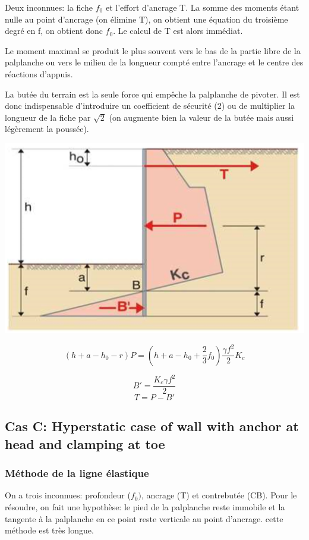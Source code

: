 Deux inconnues: la fiche $f_0$ et l'effort d'ancrage T. La somme des moments étant nulle au point d'ancrage (on élimine T), on obtient une équation du troisième degré en f, on obtient donc $f_0$. Le calcul de T est alors immédiat.

Le moment maximal se produit le plus souvent vers le bas de la partie libre de la palplanche ou vers le milieu de la longueur compté entre l'ancrage et le centre des réactions d'appuis.

La butée du terrain est la seule force qui empêche la palplanche de pivoter. Il est donc indispensable d'introduire un coefficient de sécurité (2) ou de multiplier la longueur de la fiche par $\sqrt{2}$ (on augmente bien la valeur de la butée mais aussi légèrement la poussée).

\begin{center}
\includegraphics [scale=0.8]{pictures/38.PNG}
\end{center}

$$(h+a-h_0-r)P =(h+a-h_0+\frac{2}{3}f_0)\frac{\gamma f^2}{2}K_c$$ 

$$ B'=\frac{K_c \gamma f^2}{2} $$
$$ T = P - B'$$

\subsection{Cas C: Hyperstatic case of wall with anchor at head and clamping at toe}

\subsubsection{Méthode de la ligne élastique}

On a trois inconnues: profondeur ($f_0)$, ancrage (T) et contrebutée (CB). 
Pour le résoudre, on fait une hypothèse: le pied de la palplanche reste immobile et la tangente à la palplanche en ce point reste verticale au point d'ancrage. cette méthode est très longue.

